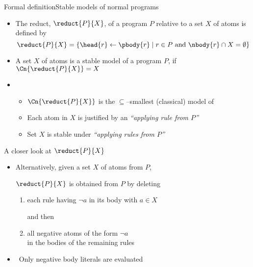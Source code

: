 \begin{frame}{Formal definition}{Stable models of normal programs}

  \begin{itemize}
  \item <1-> The \alert{reduct}, $\reduct{P}{X}$, of a program $P$ relative to
    a set $X$ of atoms is defined by
    \[
    \reduct{P}{X}
    =
    \{\head{r}\leftarrow\pbody{r} \mid r\in P \text{ and } \nbody{r}\cap X=\emptyset\}
    \]

  \item <2-> A set $X$ of atoms is a \alert{stable model} of a program $P$,
    if $\Cn{\reduct{P}{X}}=X$
    \bigskip
    \bigskip
  \item<3-> 
    \begin{itemize}
    \item<3-> $\Cn{\reduct{P}{X}}$ is the $\subseteq$--smallest (classical) model of 
      \medskip
    \item<4-> Each atom in $X$ is justified by an \emph{``applying rule from $P$''}
    \item<4-> Set $X$ is \alert{stable} under \emph{``applying rules from $P$''}
    \end{itemize}
  \end{itemize}
\end{frame}
\begin{frame}{A closer look at ${\reduct{P}{X}}$}

  \bigskip
  \begin{itemize}
  \item<1->
    Alternatively, given a set $X$ of atoms from $P$,

    \bigskip

    $\reduct{P}{X}$ is obtained from $P$ by \alert<1>{deleting}

    \medskip

    \begin{enumerate}\normalsize
    \item each \alert<1>{rule} having \alert<2>{$\neg a$} in its body with $a\in X$

      and then

      \smallskip

    \item all \alert<1>{negative atoms} of the form \alert<2>{$\neg a$}  \\
      in the bodies of the remaining rules
    \end{enumerate}
    \bigskip
  \item<2->  \ Only \alert<2>{negative body literals} are evaluated
  \end{itemize}
\end{frame}
